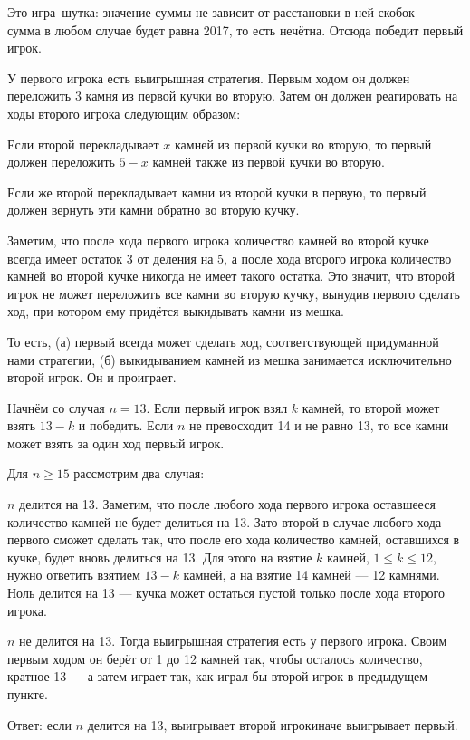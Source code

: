 \begin{itemize}

\itA Это игра–шутка: значение суммы не зависит от расстановки в ней скобок — сумма в любом случае будет равна 2017, то есть нечётна. Отсюда победит первый игрок.

\itB У первого игрока есть выигрышная стратегия. Первым ходом он должен переложить 3 камня из первой кучки во вторую. Затем он должен реагировать на ходы второго игрока следующим образом:

\subitem Если второй перекладывает $x$ камней из первой кучки во вторую, то первый должен переложить $5-x$ камней также из первой кучки во вторую.

\subitem Если же второй перекладывает камни из второй кучки в первую, то первый должен вернуть эти камни обратно во вторую кучку.

Заметим, что после хода первого игрока количество камней во второй кучке всегда имеет остаток 3 от деления на 5, а после хода второго игрока количество камней во второй кучке никогда не имеет такого остатка. Это значит, что второй игрок не может переложить все камни во вторую кучку, вынудив первого сделать ход, при котором ему придётся выкидывать камни из мешка.

То есть, (а) первый всегда может сделать ход, соответствующей придуманной нами стратегии, (б) выкидыванием камней из мешка занимается исключительно второй игрок. Он и проиграет.

\itC Начнём со случая $n=13$. Если первый игрок взял $k$ камней, то второй может взять $13-k$ и победить. Если $n$ не превосходит 14 и не равно 13, то все камни может взять за один ход первый игрок.

Для $n \ge 15$ рассмотрим два случая:

\subitem $n$ делится на 13. Заметим, что после любого хода первого игрока оставшееся количество камней не будет делиться на 13. Зато второй в случае любого хода первого сможет сделать так, что после его хода количество камней, оставшихся в кучке, будет вновь делиться на 13. Для этого на взятие $k$ камней, $1 \le k \le 12$, нужно ответить взятием $13-k$ камней, а на взятие 14 камней — 12 камнями. Ноль делится на 13 — кучка может остаться пустой только после хода второго игрока.

\subitem $n$ не делится на 13. Тогда выигрышная стратегия есть у первого игрока. Своим первым ходом он берёт от 1 до 12 камней так, чтобы осталось количество, кратное 13 — а затем играет так, как играл бы второй игрок в предыдущем пункте.

Ответ: если $n$ делится на 13, выигрывает второй игрок\scolon иначе выигрывает первый.
\end{itemize}
